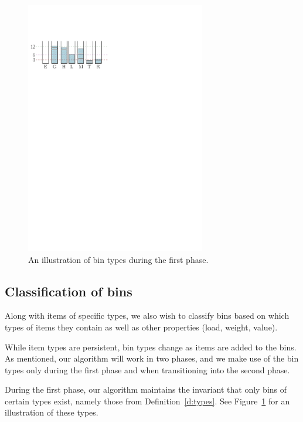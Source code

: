 \begin{figure}[th]
\begin{center}
\includegraphics[width=0.7\textwidth]{img/bin_types.pdf}
\end{center}
\caption{An illustration of bin types during the first phase.}
\label{fig:1a}
\end{figure}
%


\subsection{Classification of bins}

Along with items of specific types, we also wish to classify bins
based on which types of items they contain as well as other properties
(load, weight, value).

While item types are persistent, bin types change as items are added
to the bins. As mentioned, our algorithm will work in two phases, and
we make use of the bin types only during the first phase and when
transitioning into the second phase.

During the first phase, our algorithm maintains the invariant that
only bins of certain types exist, namely those from
Definition~\ref{d:types}. See Figure~\ref{fig:1a} for an illustration
of these types.

